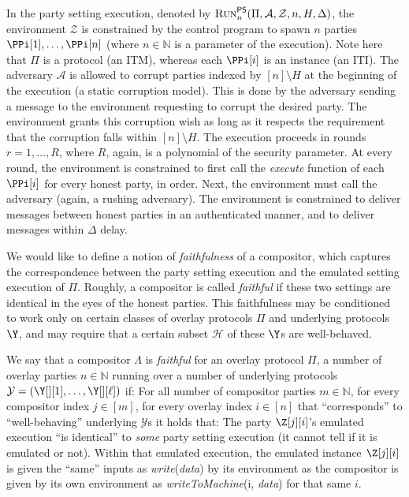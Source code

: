 In the party setting execution, denoted by $\textsc{Run}^{\textsf{PS}}_n(\Pi,\allowbreak \mathcal{A},\allowbreak \mathcal{Z},\allowbreak n,\allowbreak H,\allowbreak \Delta)$,
the environment $\mathcal{Z}$ is constrained by the control program
to spawn $n$ parties $\PPi[1], \ldots, \PPi[n]$ (where $n \in \mathbb{N}$
is a parameter of the execution). Note here that $\Pi$ is a protocol (an ITM),
whereas each $\PPi[i]$ is an instance (an ITI).
The adversary $\mathcal{A}$ is allowed to corrupt parties
indexed by $[n] \setminus H$ at the beginning of the execution
(a static corruption model). This is done by the adversary sending a message
to the environment requesting to corrupt the desired party. The environment
grants this corruption wish as long as it respects the requirement that the
corruption falls within $[n] \setminus H$.
The execution proceeds in rounds
$r = 1, \ldots, R$, where $R$, again, is a polynomial of the security
parameter. At every round, the environment is constrained to first
call the \emph{execute} function of each $\PPi[i]$ for every
honest party, in order. Next, the environment must call
the adversary (again, a rushing adversary). The environment
is constrained to deliver messages between honest parties
in an authenticated manner, and to deliver messages within $\Delta$
delay.

We would like to define a notion of \emph{faithfulness} of a
compositor, which captures the
correspondence between the party setting execution and the emulated setting
execution of $\Pi$. Roughly, a compositor is called \emph{faithful} if these
two settings are identical in the eyes of the honest parties.
This faithfulness may be conditioned to work only on certain classes
of overlay protocols $\Pi$ and underlying protocols $\Y$, and may
require that a certain subset $\mathcal{H}$ of these $\Y$s are well-behaved.

\begin{definition}
We say that a compositor $\Lambda$ is \emph{faithful} for an overlay protocol $\Pi$,
a number of overlay parties $n \in \mathbb{N}$ running
over a number of underlying protocols $\mathcal{Y} = (\Y[][1], \ldots, \Y[][\ell])$
if:
For all number of compositor parties $m \in \mathbb{N}$,
for every compositor index $j \in [m]$,
for every overlay index $i \in [n]$ that ``corresponds'' to ``well-behaving'' underlying $\mathcal{Y}$s
it holds that:
The party $\Z[j][i]$'s emulated execution ``is identical'' to \emph{some} party setting execution
(it cannot tell if it is emulated or not).
Within that emulated execution, the emulated instance $\Z[j][i]$
is given the ``same'' inputs as \emph{write}(\emph{data}) by its environment
as the compositor is given by its own environment as \emph{writeToMachine}(i, \emph{data})
for that same $i$.
\end{definition}

